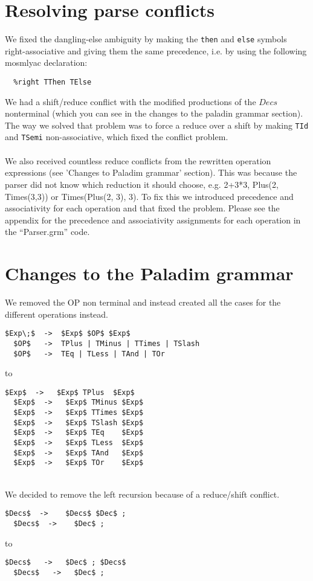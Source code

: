 \documentclass[12pt,a4paper]{article}
\begin{document}
\section{Resolving parse conflicts}
We fixed the dangling-else ambiguity by making the \texttt{then} and
\texttt{else} symbols right-associative and giving them the same precedence,
i.e. by using the following mosmlyac declaration:

\begin{verbatim}
  %right TThen TElse 
\end{verbatim}

\noindent
We had a shift/reduce conflict with the modified productions of the $Decs$
nonterminal (which you can see in the changes to the paladin grammar section).
The way we solved that problem was to force a reduce over a shift by making
\texttt{TId} and \texttt{TSemi} non-associative, which fixed the conflict
problem. \\
\\
We also received countless reduce conflicts from the rewritten operation
expressions (see 'Changes to \textsf{Paladim} grammar' section).  This was
because the parser did not know which reduction it should choose, e.g. 2+3*3,
Plus(2, Times(3,3)) or Times(Plus(2, 3), 3). To fix this we introduced
precedence and associativity for each operation and that fixed the problem.
Please see the appendix for the precedence and associativity assignments for
each operation in the ``Parser.grm'' code.

\section{Changes to the \textsf{Paladim} grammar}
We removed the OP non terminal and instead created all the cases for the
different operations instead.
\begin{lstlisting}[style=GrammarStyle]
  $Exp\;$  ->  $Exp$ $OP$ $Exp$ 
  $OP$   ->  TPlus | TMinus | TTimes | TSlash 
  $OP$   ->  TEq | TLess | TAnd | TOr
\end{lstlisting}
to
\begin{lstlisting}[style=GrammarStyle]
  $Exp$  ->   $Exp$ TPlus  $Exp$
  $Exp$  ->   $Exp$ TMinus $Exp$
  $Exp$  ->   $Exp$ TTimes $Exp$
  $Exp$  ->   $Exp$ TSlash $Exp$
  $Exp$  ->   $Exp$ TEq    $Exp$
  $Exp$  ->   $Exp$ TLess  $Exp$
  $Exp$  ->   $Exp$ TAnd   $Exp$
  $Exp$  ->   $Exp$ TOr    $Exp$ 
\end{lstlisting}
\hfill\\
We decided to remove the left recursion because of a reduce/shift conflict.
\begin{lstlisting}[style=GrammarStyle]
  $Decs$  ->    $Decs$ $Dec$ ; 
  $Decs$  ->    $Dec$ ;
\end{lstlisting}
to
\begin{lstlisting}[style=GrammarStyle]
  $Decs$   ->   $Dec$ ; $Decs$
  $Decs$   ->   $Dec$ ;
\end{lstlisting}
\end{document}
